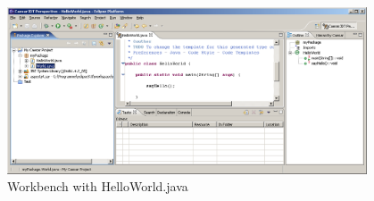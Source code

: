 \begin{figure}[htbp]
	\centering
		\includegraphics[width=0.95\textwidth]{images/workspace_newclass.png}
	\caption{Workbench with HelloWorld.java}
	\label{fig:workspace_newclass}
\end{figure}
